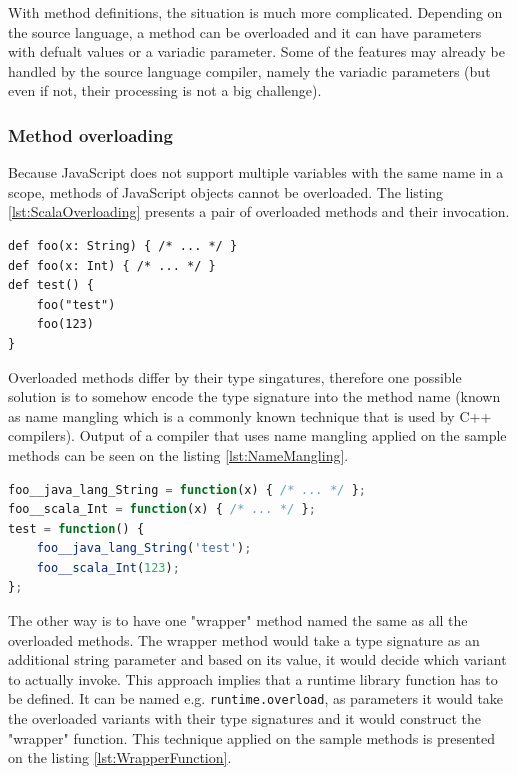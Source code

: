 \documentclass[12pt,a4paper]{report}
\begin{document}
With method definitions, the situation is much more complicated. Depending on the source language, a method can be overloaded and it can have parameters with defualt values or a variadic parameter. Some of the features may already be handled by the source language compiler, namely the variadic parameters (but even if not, their processing is not a big challenge).

\subsubsection*{Method overloading}

Because JavaScript does not support multiple variables with the same name in a scope, methods of JavaScript objects cannot be overloaded. The listing \ref{lst:ScalaOverloading} presents a pair of overloaded methods and their invocation.

\begin{minipage}{\linewidth}
\begin{lstlisting}[caption={Scala method overloading example.},label={lst:ScalaOverloading}]
def foo(x: String) { /* ... */ }
def foo(x: Int) { /* ... */ }
def test() {
	foo("test")
	foo(123)
}
\end{lstlisting}
\end{minipage}

Overloaded methods differ by their type singatures, therefore one possible solution is to somehow encode the type signature into the method name (known as name mangling which is a commonly known technique that is used by C++ compilers). Output of a compiler that uses name mangling applied on the sample methods can be seen on the listing \ref{lst:NameMangling}.

\begin{minipage}{\linewidth}
\begin{lstlisting}[language=JavaScript,caption={Overloading solved by name mangling.},label={lst:NameMangling}]
foo__java_lang_String = function(x) { /* ... */ };
foo__scala_Int = function(x) { /* ... */ };
test = function() {
	foo__java_lang_String('test');
	foo__scala_Int(123);
};
\end{lstlisting}
\end{minipage}

The other way is to have one "wrapper" method named the same as all the overloaded methods. The wrapper method would take a type signature as an additional string parameter and based on its value, it would decide which variant to actually invoke. This approach implies that a runtime library function has to be defined. It can be named e.g. \texttt{runtime.overload}, as parameters it would take the overloaded variants with their type signatures and it would construct the "wrapper" function. This technique applied on the sample methods is presented on the listing \ref{lst:WrapperFunction}.
\end{document}
